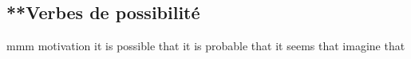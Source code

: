 
\subsection*{**Verbes de possibilité}
 { }   {mmm}
   {motivation}
   {it is possible that}
   {it is probable that}
   {it seems that}
   {imagine that}
